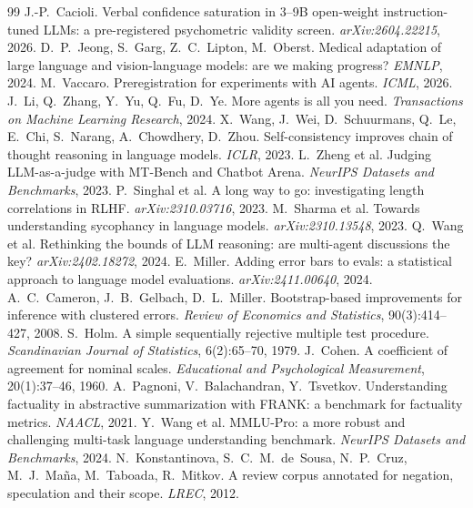 \documentclass[10pt,twocolumn]{article}
\begin{document}
\begin{thebibliography}{99}
 J.-P.~Cacioli. Verbal confidence saturation
in 3--9B open-weight instruction-tuned LLMs: a pre-registered
psychometric validity screen. \emph{arXiv:2604.22215}, 2026.
 D.~P.~Jeong, S.~Garg, Z.~C.~Lipton,
M.~Oberst. Medical adaptation of large language and vision-language
models: are we making progress? \emph{EMNLP}, 2024.
 M.~Vaccaro. Preregistration for experiments
with AI agents. \emph{ICML}, 2026.
 J.~Li, Q.~Zhang, Y.~Yu, Q.~Fu, D.~Ye. More
agents is all you need. \emph{Transactions on Machine Learning
Research}, 2024.
 X.~Wang, J.~Wei, D.~Schuurmans,
Q.~Le, E.~Chi, S.~Narang, A.~Chowdhery, D.~Zhou. Self-consistency
improves chain of thought reasoning in language models. \emph{ICLR},
2023.
 L.~Zheng et al. Judging LLM-as-a-judge with
MT-Bench and Chatbot Arena. \emph{NeurIPS Datasets and Benchmarks},
2023.
 P.~Singhal et al. A long way to go:
investigating length correlations in RLHF. \emph{arXiv:2310.03716},
2023.
 M.~Sharma et al. Towards understanding
sycophancy in language models. \emph{arXiv:2310.13548}, 2023.
 Q.~Wang et al. Rethinking the bounds of LLM
reasoning: are multi-agent discussions the key?
\emph{arXiv:2402.18272}, 2024.
 E.~Miller. Adding error bars to evals: a
statistical approach to language model evaluations.
\emph{arXiv:2411.00640}, 2024.
 A.~C.~Cameron, J.~B.~Gelbach,
D.~L.~Miller. Bootstrap-based improvements for inference with clustered
errors. \emph{Review of Economics and Statistics}, 90(3):414--427, 2008.
 S.~Holm. A simple sequentially rejective multiple
test procedure. \emph{Scandinavian Journal of Statistics}, 6(2):65--70,
1979.
 J.~Cohen. A coefficient of agreement for
nominal scales. \emph{Educational and Psychological Measurement},
20(1):37--46, 1960.
 A.~Pagnoni, V.~Balachandran, Y.~Tsvetkov.
Understanding factuality in abstractive summarization with FRANK: a
benchmark for factuality metrics. \emph{NAACL}, 2021.
 Y.~Wang et al. MMLU-Pro: a more robust and
challenging multi-task language understanding benchmark.
\emph{NeurIPS Datasets and Benchmarks}, 2024.
 N.~Konstantinova, S.~C.~M.~de~Sousa,
N.~P.~Cruz, M.~J.~Ma\~na, M.~Taboada, R.~Mitkov. A review corpus
annotated for negation, speculation and their scope. \emph{LREC}, 2012.
\end{thebibliography}
\end{document}
